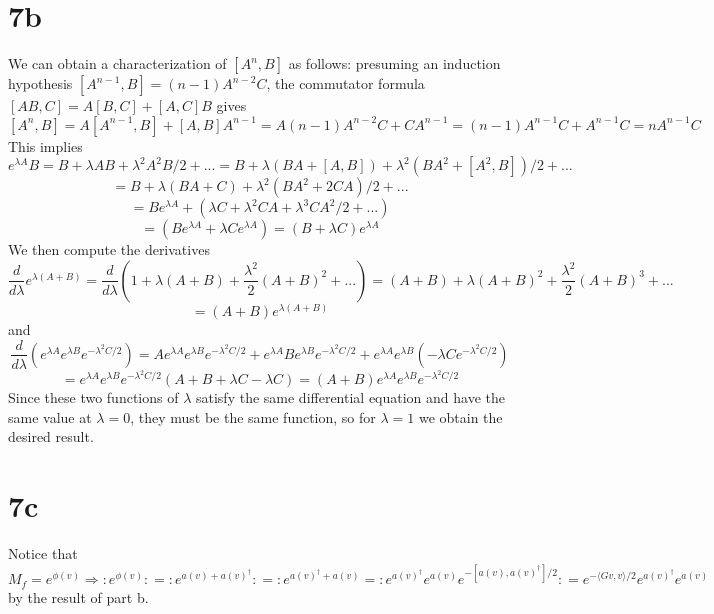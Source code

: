 \documentclass{article}
\begin{document}
\section*{7b}
We can obtain a characterization of $[A^{n},B]$ as follows:
presuming an induction hypothesis $[A^{n-1},B]=(n-1)A^{n-2}C$, the commutator formula $[AB,C]=A[B,C]+[A,C]B$ gives
\[
  [A^{n},B]=A[A^{n-1},B]+ [A,B]A^{n-1}
  =A(n-1)A^{n-2}C+CA^{n-1}
  =(n-1)A^{n-1}C+A^{n-1}C
  =nA^{n-1}C
\]
This implies
\[
  e^{\lambda A}B
  =B+\lambda AB+\lambda^{2} A^{2}B/2+...
  =B+\lambda\left( BA+[A,B] \right)+\lambda^{2}(BA^{2}+[A^{2},B])/2+...
\]
\[
  =B+\lambda\left( BA+C \right)+\lambda^{2}\left( BA^{2} +2CA\right)/2+...
\]
\[
  =Be^{\lambda A}+\left( \lambda C+ \lambda^{2}CA+\lambda^{3}CA^{2}/2+... \right)
\]
\[
  =(Be^{\lambda A}+\lambda C e^{\lambda A})=(B+\lambda C)e^{\lambda A}
\]
We then compute the derivatives
\[
  \frac{d}{d\lambda}e^{\lambda (A+B)}=\frac{d}{d\lambda}\left(  1+\lambda(A+B)+\frac{\lambda^{2}}{2}(A+B)^{2}+...\right)
  =(A+B)+\lambda (A+B)^{2}+\frac{\lambda^{2}}{2}(A+B)^{3}+...
\]
\[
  =(A+B)e^{\lambda(A+B)}
\]
and
\[
  \frac{d}{d\lambda}(e^{\lambda A}e^{\lambda B}e^{-\lambda^{2}C/2})
  =Ae^{\lambda A}e^{\lambda B}e^{-\lambda^{2}C/2}+e^{\lambda A}Be^{\lambda B}e^{-\lambda^{2}C/2}
  +e^{\lambda A}e^{\lambda B}\left( -\lambda Ce^{-\lambda^{2}C/2} \right)
\]
\[
  =e^{\lambda A}e^{\lambda B}e^{-\lambda^{2}C/2}\left( A+B+\lambda C-\lambda C \right)
  =(A+B)e^{\lambda A}e^{\lambda B}e^{-\lambda^{2}C/2}
\]
Since these two functions of $\lambda$ satisfy the same differential equation and have the same value at $\lambda=0$,
they must be the same function, so for $\lambda=1$ we obtain the desired result.

\section*{7c}
Notice that
\[
  M_{f}=e^{\phi(v)}
  \Rightarrow :e^{\phi(v)}:
  =:e^{a(v)+a(v)^{\dagger}}:
  =:e^{a(v)^{\dagger}+a(v)}
  =:e^{a(v)^{\dagger}}e^{a(v)}e^{-[a(v),a(v)^{\dagger}]/2}:
  =e^{-\langle Gv,v \rangle/2}e^{a(v)^{\dagger}}e^{a(v)}
\]
by the result of part b.
\end{document}
